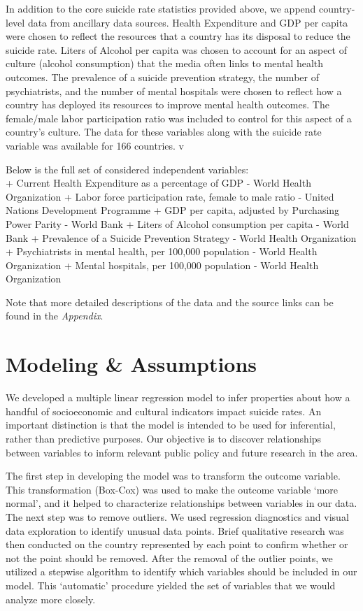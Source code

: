 \documentclass[]{article}
\begin{document}
In addition to the core suicide rate statistics provided above, we
append country-level data from ancillary data sources. Health
Expenditure and GDP per capita were chosen to reflect the resources that
a country has its disposal to reduce the suicide rate. Liters of Alcohol
per capita was chosen to account for an aspect of culture (alcohol
consumption) that the media often links to mental health outcomes. The
prevalence of a suicide prevention strategy, the number of
psychiatrists, and the number of mental hospitals were chosen to reflect
how a country has deployed its resources to improve mental health
outcomes. The female/male labor participation ratio was included to
control for this aspect of a country's culture. The data for these
variables along with the suicide rate variable was available for 166
countries. v

Below is the full set of considered independent variables:\\
+ Current Health Expenditure as a percentage of GDP - World Health
Organization + Labor force participation rate, female to male ratio -
United Nations Development Programme + GDP per capita, adjusted by
Purchasing Power Parity - World Bank + Liters of Alcohol consumption per
capita - World Bank + Prevalence of a Suicide Prevention Strategy -
World Health Organization + Psychiatrists in mental health, per 100,000
population - World Health Organization + Mental hospitals, per 100,000
population - World Health Organization

Note that more detailed descriptions of the data and the source links
can be found in the \emph{Appendix}.

\section{Modeling \& Assumptions}\label{modeling-assumptions}

We developed a multiple linear regression model to infer properties
about how a handful of socioeconomic and cultural indicators impact
suicide rates. An important distinction is that the model is intended to
be used for inferential, rather than predictive purposes. Our objective
is to discover relationships between variables to inform relevant public
policy and future research in the area.

The first step in developing the model was to transform the outcome
variable. This transformation (Box-Cox) was used to make the outcome
variable `more normal', and it helped to characterize relationships
between variables in our data. The next step was to remove outliers. We
used regression diagnostics and visual data exploration to identify
unusual data points. Brief qualitative research was then conducted on
the country represented by each point to confirm whether or not the
point should be removed. After the removal of the outlier points, we
utilized a stepwise algorithm to identify which variables should be
included in our model. This `automatic' procedure yielded the set of
variables that we would analyze more closely.
\end{document}
